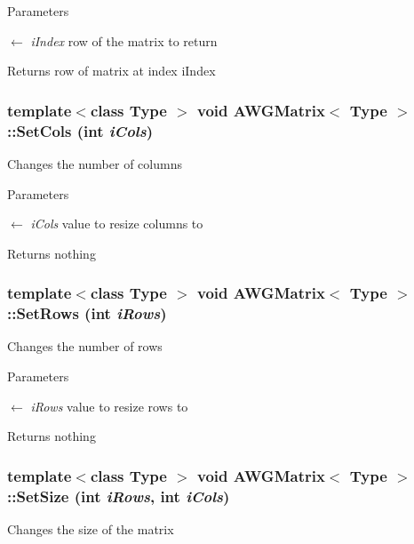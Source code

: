 \begin{DoxyParams}{Parameters}
\item[\mbox{$\leftarrow$} {\em iIndex}]row of the matrix to return \end{DoxyParams}
\begin{DoxyReturn}{Returns}
row of matrix at index iIndex 
\end{DoxyReturn}
\hypertarget{classAWGMatrix_a6bb6e928d147d77d7788634bdac248b6}{
\subsubsection[{SetCols}]{\setlength{\rightskip}{0pt plus 5cm}template$<$class Type $>$ void {\bf AWGMatrix}$<$ Type $>$::SetCols (int {\em iCols})}}
\label{classAWGMatrix_a6bb6e928d147d77d7788634bdac248b6}
Changes the number of columns


\begin{DoxyParams}{Parameters}
\item[\mbox{$\leftarrow$} {\em iCols}]value to resize columns to \end{DoxyParams}
\begin{DoxyReturn}{Returns}
nothing 
\end{DoxyReturn}
\hypertarget{classAWGMatrix_a8af3512aa03ae0142f49ede0a7a10e89}{
\subsubsection[{SetRows}]{\setlength{\rightskip}{0pt plus 5cm}template$<$class Type $>$ void {\bf AWGMatrix}$<$ Type $>$::SetRows (int {\em iRows})}}
\label{classAWGMatrix_a8af3512aa03ae0142f49ede0a7a10e89}
Changes the number of rows


\begin{DoxyParams}{Parameters}
\item[\mbox{$\leftarrow$} {\em iRows}]value to resize rows to \end{DoxyParams}
\begin{DoxyReturn}{Returns}
nothing 
\end{DoxyReturn}
\hypertarget{classAWGMatrix_a8a1bf260b9969f8fb7119b65384181b0}{
\subsubsection[{SetSize}]{\setlength{\rightskip}{0pt plus 5cm}template$<$class Type $>$ void {\bf AWGMatrix}$<$ Type $>$::SetSize (int {\em iRows}, \/  int {\em iCols})}}
\label{classAWGMatrix_a8a1bf260b9969f8fb7119b65384181b0}
Changes the size of the matrix


